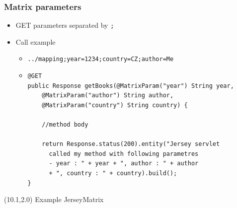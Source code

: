 \documentclass[10pt,xcolor=pdflatex]{beamer}
\begin{document}
\begin{frame}[containsverbatim]\frametitle{Matrix parameters}
\begin{itemize}
	\item GET parameters separated by \texttt{;}
    \item Call example
	  \begin{itemize}
	    \item \texttt{../mapping;year=1234;country=CZ;author=Me}
        \vspace*{.5cm}
	    \item[] \begin{footnotesize}
	    \begin{verbatim}
@GET
public Response getBooks(@MatrixParam("year") String year,
    @MatrixParam("author") String author,
    @MatrixParam("country") String country) {

    //method body

    return Response.status(200).entity("Jersey servlet 
      called my method with following parametres 
      - year : " + year + ", author : " + author 
      + ", country : " + country).build(); 
}
	\end{verbatim}
	  \end{footnotesize}
	  \end{itemize}
\end{itemize}
\begin{textblock}{5}(10.1,2.0)
    {\footnotesize Example JerseyMatrix}
\end{textblock}
\end{frame}
\end{document}
